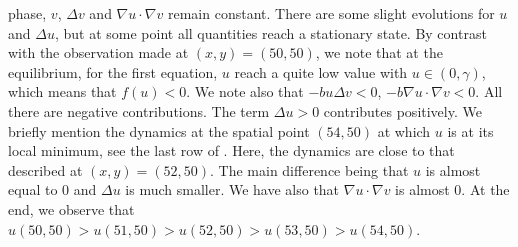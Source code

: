 \documentclass[final,1p,times]{elsarticle}
\begin{document}
phase, $v$, $\Delta v$ and $\nabla u \cdot \nabla v$ remain constant. There are some slight evolutions for $u$ and $\Delta u$, but at some point all quantities reach a stationary state. By contrast with the observation made at $(x,y)=(50,50)$, we note that at the equilibrium, for the first equation, $u$ reach a quite low value with $u\in(0,\gamma)$, which means that $f(u)<0$. We note also that $-bu\Delta v<0$, $-b\nabla u \cdot \nabla v<0$. All there are negative contributions. The term $\Delta u>0$ contributes positively. We briefly mention the dynamics at the spatial point $(54,50)$ at which $u$ is at its local minimum, see the last row of . Here, the dynamics are close to that described at $(x,y)=(52,50)$. The main difference being that $u$ is almost equal to $0$ and $\Delta u$ is  much smaller. We have also that $\nabla u \cdot \nabla v$ is almost $0$. At the end, we observe that $u(50,50)>u(51,50)>u(52,50)>u(53,50)>u(54,50)$.


\end{document}
